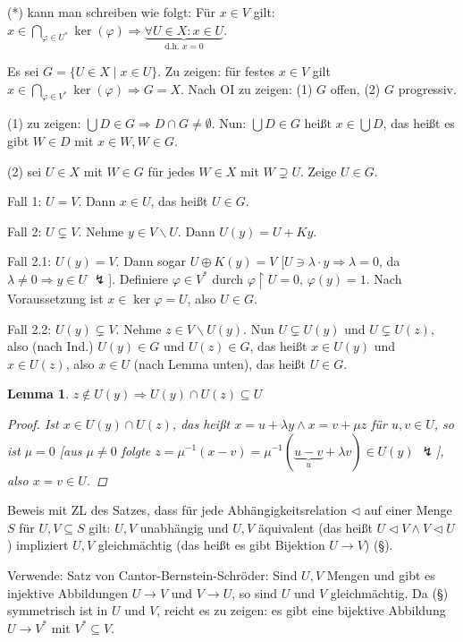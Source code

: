 \documentclass[headsepline=true,DIV=11]{scrartcl}
\newtheorem*{lemma}{Lemma}
\theoremstyle{definition}
\begin{document}
(*) kann man schreiben wie folgt: Für $x\in V$ gilt: $x\in\bigcap\limits_{\varphi\in U^*}\ker(\varphi) \Rightarrow \underbrace{\forall U\in X: x\in
    U}_{\mbox{d.h. }x=0}$.

Es sei $G=\{U\in X\mid x\in U\}$. Zu zeigen: für festes $x\in V$ gilt $x\in\bigcap\limits_{\varphi\in V^*}\ker(\varphi)\Rightarrow G=X$. Nach OI zu
zeigen: (1) $G$ offen, (2) $G$ progressiv.

(1) zu zeigen: $\bigcup D\in G\Rightarrow D\cap G\neq\emptyset$. Nun: $\bigcup D\in G$ heißt $x\in\bigcup D$, das heißt es gibt $W\in D$ mit $x\in W,
W\in G$.

(2) sei $U\in X$ mit $W\in G$ für jedes $W\in X$ mit $W\supsetneq U$. Zeige $U\in G$.

Fall 1: $U=V$. Dann $x\in U$, das heißt $U\in G$.

Fall 2: $U\subsetneq V$. Nehme $y\in V\backslash U$. Dann $U(y)=U+Ky$.

Fall 2.1: $U(y)=V$. Dann sogar $U\oplus K(y)=V$ [$U\ni\lambda\cdot y\Rightarrow\lambda=0$, da $\lambda\neq 0\Rightarrow y\in U$ $\lightning$]. Definiere $\varphi\in V^*$ durch $\varphi\upharpoonright U=0$,
$\varphi(y)=1$. Nach Voraussetzung ist $x\in\ker\varphi=U$, also $U\in G$.

Fall 2.2: $U(y)\subsetneq V$. Nehme $z\in V\backslash U(y)$. Nun
$U\subsetneq U(y)$ und $U\subsetneq U(z)$, also (nach Ind.) $U(y)\in G$ und $U(z)\in G$, das heißt $x\in U(y)$ und $x\in U(z)$, also $x\in U$ (nach
Lemma unten), das heißt $U\in G$.

\begin{lemma}
  $z\not\in U(y)\Rightarrow U(y)\cap U(z)\subseteq U$
  \begin{proof}
    Ist $x\in U(y)\cap U(z)$, das heißt $x=u+\lambda y\land x=v+\mu z$ für $u,v\in U$, so ist $\mu = 0$ [aus $\mu\neq 0$ folgte
      $z=\mu^{-1}(x-v)=\mu^{-1}(\underbrace{u-v}_{u}+\lambda v)\in U(y)$ $\lightning$], also $x=v\in U$.
  \end{proof}
\end{lemma}

Beweis mit ZL des Satzes, dass für jede Abhängigkeitsrelation $\lhd$ auf einer Menge $S$ für $U, V\subseteq S$ gilt: $U, V$ unabhängig und $U, V$
äquivalent (das heißt $U\lhd V\land V\lhd U$) impliziert $U, V$ gleichmächtig (das heißt es gibt Bijektion $U\rightarrow V$) (§).

Verwende: Satz von Cantor-Bernstein-Schröder: Sind $U, V$ Mengen und gibt es injektive Abbildungen $U\rightarrow V$ und $V\rightarrow U$, so sind $U$
und $V$ gleichmächtig. Da (§) symmetrisch ist in $U$ und $V$, reicht es zu zeigen: es gibt eine bijektive Abbildung $U\rightarrow V^*$ mit
$V^*\subseteq V$.
\end{document}
